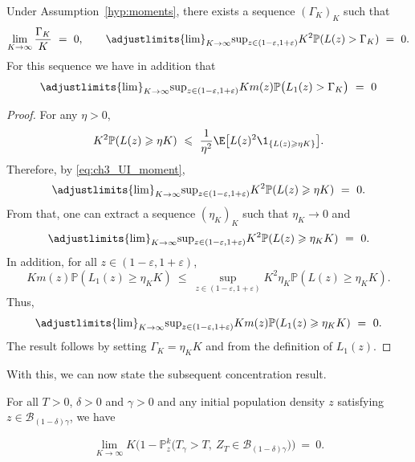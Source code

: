 \begin{refsegment}
\begin{lem}\label{lem:ch4_coupling_capped}
    Under Assumption~\ref{hyp:moments}, there exists a sequence
    $(\Gamma_K)_K$ such that
    \[
        \lim_{K \to \infty} \frac{\Gamma_K}{K}\ =\ 0,
        \qquad
        \adjustlimits{\lim}_{K \to \infty}{\sup}_{z \in (1-\varepsilon, 1+\varepsilon)} 
        K^2 \mathbb{P}( L(z) > \Gamma_K)\ =\ 0.
    \]
For this sequence we have in addition that 
\[
\adjustlimits{\lim}_{K \to \infty}{\sup}_{z \in (1-\varepsilon, 1+\varepsilon)} 
        K m(z) \mathbb{P}\big(L_1(z) > \Gamma_K\big)\ =\ 0
\]
\end{lem}

\begin{proof}
    For any $\eta > 0$,
    \[
        K^2 \mathbb{P}( L(z) \geqslant \eta K) 
      \  \leqslant \
        \frac{1}{\eta^2} \E\big[ L(z)^2 \1_{\{ L(z) \geqslant \eta K\}} \big].
    \]
    Therefore, by \eqref{eq:ch3_UI_moment},
    \[
         \adjustlimits{\lim}_{K \to \infty}{\sup}_{z \in (1-\varepsilon, 1+\varepsilon)} K^2 \mathbb{P}( L(z) \geqslant \eta K) 
      \ =\ 0.
    \]
    From that, one can extract a sequence $(\eta_K)_K$ such that
    $\eta_K \to 0$ and 
    \[
        \adjustlimits{\lim}_{K \to \infty}{\sup}_{z \in (1-\varepsilon, 1+\varepsilon)}  K^2 \mathbb{P}( L(z) \geqslant \eta_K K) 
       \ =\ 0.
    \]
    In addition, for all $z \in (1-\varepsilon, 1+\varepsilon)$,
    \[
     K m(z) \mathbb{P}( L_1(z) \geqslant \eta_K K) \ \leqslant\ \sup_{z \in (1-\varepsilon, 1+\varepsilon)}  K^2 \eta_K \mathbb{P}( L(z) \geqslant \eta_K K). 
    \]
    Thus,
    \begin{equation*}
        \adjustlimits{\lim}_{K \to \infty}{\sup}_{z \in (1-\varepsilon, 1+\varepsilon)}  K m(z) \mathbb{P}( L_1(z) \geqslant \eta_K K)\  = \ 0.
    \end{equation*}
The result follows by setting $\Gamma_K = \eta_K K$ and from the
    definition of $L_1(z)$. 
\end{proof}

With this, we can now state the subsequent concentration result. 
\begin{lem}\label{lem:mdp_smalllem} 
  For all $T>0$,  $\delta>0$ and $ \gamma>0$ and any  initial population density $z$ satisfying $z\in \mathscr{B}_{(1-\delta)\gamma}$, we have

\begin{equation*}
   \lim_{K\to\infty} K\Big(1-\mathbb{P}^k_{z}\big( T_{\gamma}> T , \  Z_{T}\in \mathscr{B}_{
    (1-\delta)\gamma}\big)\Big) \ = \ 0.
\end{equation*} 


\end{lem}
\end{refsegment}
